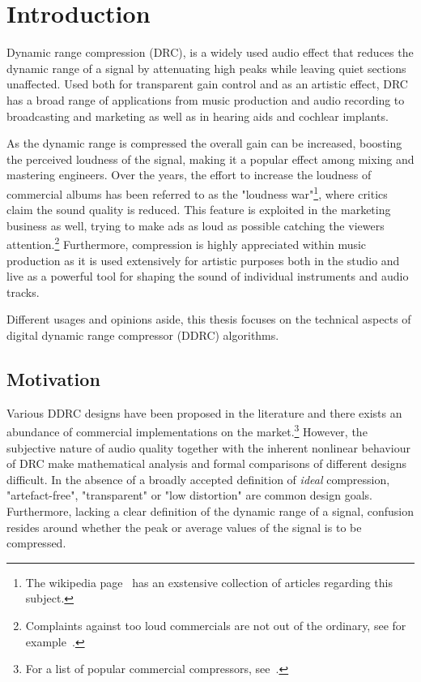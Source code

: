 \documentclass[../main2.tex]{subfiles}
\begin{document}
\section{Introduction}
Dynamic range compression (DRC), is a widely used audio effect that reduces the dynamic range of a signal by attenuating high peaks while leaving quiet sections unaffected. Used both for transparent gain control and as an artistic effect, DRC has a broad range of applications from music production and audio recording to broadcasting and marketing as well as in hearing aids and cochlear implants.

As the dynamic range is compressed the overall gain can be increased, boosting the perceived loudness of the signal, making it a popular effect among mixing and mastering engineers. Over the years, the effort to increase the loudness of commercial albums has been referred to as the "loudness war"\footnote{The wikipedia page~\cite{loudness_war} has an exstensive collection of articles regarding this subject.}, where critics claim the sound quality is reduced. This feature is exploited in the marketing business as well, trying to make ads as loud as possible catching the viewers attention.\footnote{Complaints against too loud commercials are not out of the ordinary, see for example~\cite{comp_ads}.} Furthermore, compression is highly appreciated within music production as it is used extensively for artistic purposes both in the studio and live as a powerful tool for shaping the sound of individual instruments and audio tracks.

Different usages and opinions aside, this thesis focuses on the technical aspects of digital dynamic range compressor (DDRC) algorithms. 


\subsection{Motivation}
Various DDRC designs have been proposed in the literature and there exists an abundance of commercial implementations on the market.\footnote{For a list of popular commercial compressors, see~\cite{commercial}.} However, the subjective nature of audio quality together with the inherent nonlinear behaviour of DRC make mathematical analysis and formal comparisons of different designs difficult. In the absence of a broadly accepted definition of \emph{ideal} compression, "artefact-free", "transparent" or "low distortion" are common design goals. Furthermore, lacking a clear definition of the dynamic range of a signal, confusion resides around whether the peak or average values of the signal is to be compressed. 
\end{document}
